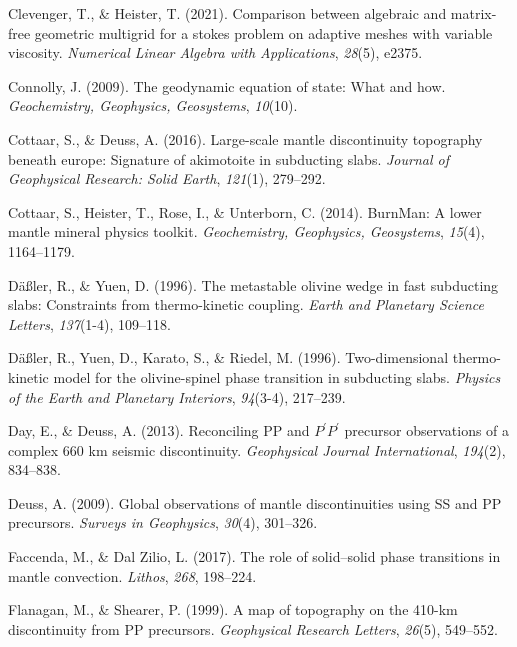 \documentclass[draft,linenumbers]{agujournal2019}
\newlength{\cslhangindent}
\newenvironment{CSLReferences}[2]
 {\begin{list}{}{
  \setlength{\itemindent}{0pt}
  \setlength{\leftmargin}{0pt}
  \setlength{\parsep}{0pt}
  \ifodd #1
   \setlength{\leftmargin}{\cslhangindent}
   \setlength{\itemindent}{-\cslhangindent}
  \fi
  \setlength{\itemsep}{#2\baselineskip}
  }
  \item\relax}
 {\end{list}}
\begin{document}
\begin{CSLReferences}{1}{0}
Clevenger, T., \& Heister, T. (2021). Comparison between algebraic and
matrix-free geometric multigrid for a stokes problem on adaptive meshes
with variable viscosity. \emph{Numerical Linear Algebra with
Applications}, \emph{28}(5), e2375.

Connolly, J. (2009). The geodynamic equation of state: What and how.
\emph{Geochemistry, Geophysics, Geosystems}, \emph{10}(10).

Cottaar, S., \& Deuss, A. (2016). Large-scale mantle discontinuity
topography beneath europe: Signature of akimotoite in subducting slabs.
\emph{Journal of Geophysical Research: Solid Earth}, \emph{121}(1),
279--292.

Cottaar, S., Heister, T., Rose, I., \& Unterborn, C. (2014). BurnMan: A
lower mantle mineral physics toolkit. \emph{Geochemistry, Geophysics,
Geosystems}, \emph{15}(4), 1164--1179.

Däßler, R., \& Yuen, D. (1996). The metastable olivine wedge in fast
subducting slabs: Constraints from thermo-kinetic coupling. \emph{Earth
and Planetary Science Letters}, \emph{137}(1-4), 109--118.

Däßler, R., Yuen, D., Karato, S., \& Riedel, M. (1996). Two-dimensional
thermo-kinetic model for the olivine-spinel phase transition in
subducting slabs. \emph{Physics of the Earth and Planetary Interiors},
\emph{94}(3-4), 217--239.

Day, E., \& Deuss, A. (2013). Reconciling PP and {\(P^\prime P^\prime\)}
precursor observations of a complex 660 km seismic discontinuity.
\emph{Geophysical Journal International}, \emph{194}(2), 834--838.

Deuss, A. (2009). Global observations of mantle discontinuities using SS
and PP precursors. \emph{Surveys in Geophysics}, \emph{30}(4), 301--326.

Faccenda, M., \& Dal Zilio, L. (2017). The role of solid--solid phase
transitions in mantle convection. \emph{Lithos}, \emph{268}, 198--224.

Flanagan, M., \& Shearer, P. (1999). A map of topography on the 410-km
discontinuity from PP precursors. \emph{Geophysical Research Letters},
\emph{26}(5), 549--552.


\end{CSLReferences}
\end{document}
